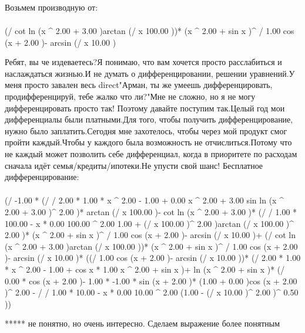 Возьмем производную от:
\begin{gather}
\end{gather}
\begin{}
(/ {cot ln (x ^ {2.00 }+ 3.00 )}{arctan (/ {x }{100.00 })})* (x ^ {2.00 }+ sin x )^ {/ {1.00 }{cos (x + 2.00 )}- arcsin (/ {x }{10.00 })}\\
\end{}
Ребят, вы че издеваетесь?Я понимаю, что вам хочется просто расслабиться и наслаждаться жизнью.И не думать о дифференцировании, решении уравнений.У меня просто завален весь direct"Арман, ты же умеешь дифференцировать, продифференцируй, тебе жалко что ли?"Мне не сложно, но я не могу дифференцировать просто так! Поэтому давайте поступим так.Целый год мои дифференциалы были платными.Для того, чтобы получить дифференцирование, нужно было заплатить.Сегодня мне захотелось, чтобы через мой продукт смог пройти каждый.Чтобы у каждого была возможность не отчислиться.Потому что не каждый может позволить себе дифференциал, когда в приоритете по расходам сначала идёт семья/кредиты/ипотеки.Не упусти свой шанс! Бесплатное дифференцирование: 
\begin{gather}
\end{gather}
\begin{}
(/ {-1.00 * (/ {/ {2.00 * 1.00 * x ^ {2.00 - 1.00 }+ 0.00 }{x ^ {2.00 }+ 3.00 }}{sin ln (x ^ {2.00 }+ 3.00 )^ {2.00 }})* arctan (/ {x }{100.00 })- cot ln (x ^ {2.00 }+ 3.00 )* (/ {/ {1.00 * 100.00 - x * 0.00 }{100.00 ^ {2.00 }}}{1.00 + (/ {x }{100.00 })^ {2.00 }})}{arctan (/ {x }{100.00 })^ {2.00 }})* (x ^ {2.00 }+ sin x )^ {/ {1.00 }{cos (x + 2.00 )}- arcsin (/ {x }{10.00 })}+ (/ {cot ln (x ^ {2.00 }+ 3.00 )}{arctan (/ {x }{100.00 })})* (x ^ {2.00 }+ sin x )^ {/ {1.00 }{cos (x + 2.00 )}- arcsin (/ {x }{10.00 })}* ((/ {1.00 }{cos (x + 2.00 )}- arcsin (/ {x }{10.00 }))* (/ {2.00 * 1.00 * x ^ {2.00 - 1.00 }+ cos x * 1.00 }{x ^ {2.00 }+ sin x })+ ln (x ^ {2.00 }+ sin x )* (/ {0.00 * cos (x + 2.00 )- 1.00 * -1.00 * sin (x + 2.00 )* (1.00 + 0.00 )}{cos (x + 2.00 )^ {2.00 }}- / {/ {1.00 * 10.00 - x * 0.00 }{10.00 ^ {2.00 }}}{(1.00 - (/ {x }{10.00 })^ {2.00 })^ {0.50 }}))\\
\end{}
***** не понятно, но очень интересно. Сделаем выражение более понятным
